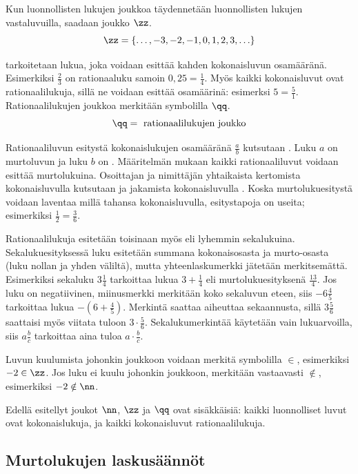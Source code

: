 Kun luonnollisten lukujen joukkoa täydennetään luonnollisten lukujen vastaluvuilla, saadaan  joukko $\zz$.
\[\zz=\{\ldots, -3, -2, -1, 0, 1, 2, 3, \ldots \} \]

 tarkoitetaan lukua, joka voidaan esittää kahden kokonaisluvun osamääränä. Esimerkiksi $\frac{2}{3}$ on rationaaluku samoin $0,25=\frac{1}{4}$.
Myös kaikki kokonaisluvut ovat rationaalilukuja, sillä ne voidaan esittää osamäärinä:
esimerksi $5=\frac{5}{1}$. Rationaalilukujen joukkoa merkitään symbolilla $\qq$.
\[\qq= \text{ rationaalilukujen joukko} \]    

Rationaaliluvun esitystä kokonaislukujen osamääränä
$\frac{a}{b}$ kutsutaan . Luku $a$ on murtoluvun
 ja luku $b$ on
. Määritelmän mukaan kaikki rationaaliluvut
voidaan esittää murtolukuina. Osoittajan ja nimittäjän yhtaikaista kertomista kokonaisluvulla kutsutaan
 ja jakamista kokonaisluvulla .
Koska murtolukuesitystä voidaan laventaa millä tahansa kokonaisluvulla, esitystapoja on useita; esimerkiksi $\frac{1}{2}=\frac{3}{6}$.

Rationaalilukuja esitetään toisinaan myös  eli lyhemmin sekalukuina. Sekalukuesityksessä
luku esitetään summana kokonaisosasta ja murto-osasta (luku nollan ja yhden väliltä), mutta yhteenlaskumerkki jätetään merkitsemättä.
Esimerkiksi sekaluku $3\frac{1}{4}$ tarkoittaa lukua $3 + \frac{1}{4}$ eli murtolukuesityksenä $\frac{13}{4}$. Jos luku on negatiivinen,
miinusmerkki merkitään koko sekaluvun eteen, siis $-6\frac{4}{5}$ tarkoittaa lukua $-(6 + \frac{4}{5})$. Merkintä saattaa aiheuttaa
sekaannusta, sillä $3\frac{5}{6}$ saattaisi myös viitata tuloon $3\cdot \frac{5}{6}$. Sekalukumerkintää käytetään vain lukuarvoilla,
siis $a\frac{b}{c}$ tarkoittaa aina tuloa $a\cdot \frac{b}{c}$.

Luvun kuulumista johonkin joukkoon voidaan merkitä symbolilla $\in$,
esimerkiksi $-2 \in \zz$. Jos luku ei kuulu johonkin joukkoon, merkitään vastaavasti $\notin$, esimerkiksi $-2 \notin \nn$.

Edellä esitellyt joukot $\nn$, $\zz$ ja 
$\qq$ ovat sisäkkäisiä: kaikki luonnolliset luvut ovat kokonaislukuja, ja kaikki kokonaisluvut rationaalilukuja.

\subsection*{Murtolukujen laskusäännöt}

